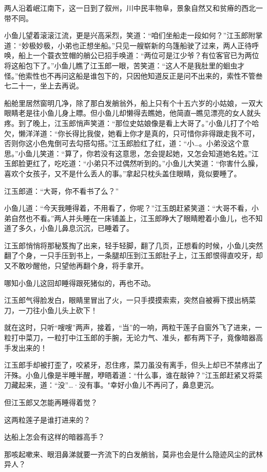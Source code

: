 \documentclass[12pt,oneside]{book}
\begin{document}
两人沿着岷江南下，这一日到了叙州，川中民丰物阜，景象自然又和贫瘠的西北一带不同。

小鱼儿望着滚滚江流，更是兴高采烈，笑道：``咱们坐船走一段如何？''江玉郎附掌道：``妙极妙极，小弟也正想坐船。''只见一艘崭新的乌篷船驶了过来，两人正待呼唤，船上一个蓑衣笠帽的艄公已招手唤道：``两位可是江少爷？有位客官已为两位将这船包下了。''小鱼儿瞧了江玉郎一眼，苦笑道：``这人不是我肚里的蛔虫才怪。''他索性也不再问这船是谁包下的，只因他知道反正是问不出来的，索性不管叁七二十一，坐上去再说。

船舱里居然窗明几净，除了那白发艄翁外，船上只有个十五六岁的小姑娘，一双大眼睛老是往小鱼儿身上瞟。但小鱼儿却懒得去瞧她，他简直─瞧见漂亮的女人就头疼。到了晚上，江玉郎悄声笑道：``那位史姑娘像是看上大哥了。''小鱼儿打了个哈欠，懒洋洋道：``你长得比我俊，她看上你才是真的，只可惜你非得跟走我不可，否则你这小色鬼倒可去勾搭勾搭。''江玉郎脸红了红，道：``小\ldots。小弟没这个意思。''小鱼儿笑道：``算了，你若没有这意思，怎会提起她，又怎会知道她名姓。''江玉郎脸更红了，吃吃道：``小弟只不过偶然听到的。''小鱼儿大笑道：``你害什么臊，喜欢个女孩子，又不是什么丢人的事。''拿起只枕头盖住眼睛，竟似要睡了。

江玉郎道：``大哥，你不看书了么？''

小鱼儿道：``今天我睡得着，不用看了，你呢？''江玉朗赶紧笑道：``大哥不看，小弟自然也不看。''两人并头睡在一床铺盖上，江玉郎睁大了眼睛瞪着小鱼儿，也不知道了多久，小鱼儿鼻息沉沉，已睡着了。

江玉郎悄悄将那秘笈掏了出来，轻手轻脚，翻了几页，正想看的时候，小鱼儿突然翻了个身，一只手压到书上，一条腿却压到江玉郎肚子上，江玉郎恨得直咬牙，却又不敢吵醒他，只望他再翻个身，将手拿开。

哪知小鱼儿这回却睡得跟死猪似的，再也不动。

江玉郎气得脸发白，眼睛里冒出了火，一只手摸摸索索，突然自被褥下摸出柄菜刀，一刀往小鱼儿头上砍下！

就在这时，只听``嗖嗖''两声，接着，``当''的一响，两粒干莲子自窗外飞了进来，一粒打中菜刀，一粒打中江玉郎的手腕，无论力气、准头，都有两下子，竟像暗器高手发出来的！

江玉郎手却被打歪了，咬紧牙，忍住疼，菜刀虽没有离手，但头上却已不禁疼出了汗殊。小鱼儿像是半睡半醒，咿晤着道：``什么事，谁在敲钟？''江玉郎赶紧又将菜刀藏起来，道：``没''\ldots·没有事。"幸好小鱼儿不再问了，鼻息更沉。

但江玉郎又怎能再睡得着觉？

这两粒莲子是谁打进来的？

达船上怎会有这样的暗器高手？

那咳起嗽来、眼泪鼻涕就要一齐流下的白发艄翁，莫非也会是什么隐迹风尘的武林异人？
\end{document}
